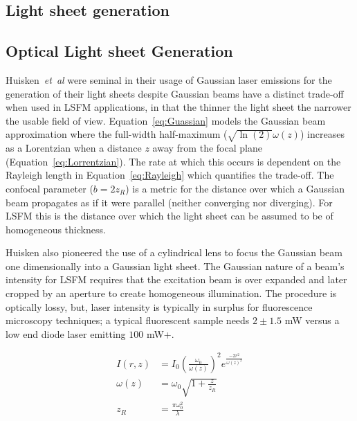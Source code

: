 \subsection{Light sheet generation}
\subsection{Optical Light sheet Generation}


Huisken~\emph{et~al} were seminal in their usage of Gaussian laser emissions for the generation of their light sheets despite Gaussian beams have a distinct trade-off when used in LSFM applications, in that the thinner the light sheet the narrower the usable field of view.
Equation~\eqref{eq:Guassian} models the Gaussian beam approximation where the full-width half-maximum ($\sqrt{\ln(2)}\omega(z)$) %
increases as a Lorentzian when a distance $z$ away from the focal plane (Equation~\eqref{eq:Lorrentzian}).
The rate at which this occurs is dependent on the Rayleigh length in Equation~\eqref{eq:Rayleigh} which quantifies the trade-off.
The confocal parameter ($b=2z_R$) is a metric for the distance over which a Gaussian beam propagates as if it were parallel (neither converging nor diverging).
For LSFM this is the distance over which the light sheet can be assumed to be of homogeneous thickness.

Huisken also pioneered the use of a cylindrical lens to focus the Gaussian beam one dimensionally into a Gaussian light sheet.
The Gaussian nature of a beam's intensity for LSFM requires that the excitation beam is over expanded and later cropped by an aperture to create homogeneous illumination.
The procedure is optically lossy, but, laser intensity is typically in surplus for fluorescence microscopy techniques; a typical fluorescent sample needs $2\pm 1.5$ mW versus a low end diode laser emitting $100$ mW+.


\begin{align}
	I(r,z)    & = {I_0} {\left(\frac{\omega_0}{\omega{(z)}}\right)}^2 {e^{\frac{-2r^2}{\omega{(z)}^2}}\label{eq:Guassian}} \\
	\omega(z) & = \omega_0 \sqrt{1+\frac{z}{z_R}} \label{eq:Lorrentzian}                                                   \\
	z_R       & = \frac{\pi\omega_0^2}{\lambda} \label{eq:Rayleigh}
\end{align}

